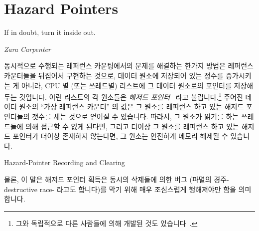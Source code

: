 
\section{Hazard Pointers}
\label{sec:defer:Hazard Pointers}
%
\epigraph{If in doubt, turn it inside out.}{\emph{Zara Carpenter}}

동시적으로 수행되는 레퍼런스 카운팅에서의 문제를 해결하는 한가지 방법은
레퍼런스 카운터들을 뒤집어서 구현하는 것으로,
데이터 원소에 저장되어 있는 정수를 증가시키는 게 아니라, CPU 별 (또는 쓰레드별)
리스트에 그 데이터 원소로의 포인터를 저장해 두는 것입니다.
이런 리스트의 각 원소들은 \emph{해저드 포인터}~\cite{MagedMichael04a} 라고
불립니다.\footnote{
	그와 독립적으로 다른 사람들에 의해 개발된 것도
	있습니다~\cite{HerlihyLM02}.}
주어진 데이터 원소의 ``가상 레퍼런스 카운터'' 의 값은 그 원소를 레퍼런스 하고
있는 해저드 포인터들의 갯수를 세는 것으로 얻어질 수 있습니다.
따라서, 그 원소가 읽기를 하는 쓰레드들에 의해 접근할 수 없게 된다면, 그리고
더이상 그 원소를 레퍼런스 하고 있는 해저드 포인터가 더이상 존재하지 않는다면,
그 원소는 안전하게 메모리 해제될 수 있습니다.

\begin{listing}[tbp]

\caption{Hazard-Pointer Recording and Clearing}
\label{lst:defer:Hazard-Pointer Recording and Clearing}
\end{listing}

물론, 이 말은 해저드 포인터 획득은 동시의 삭제들에 의한 버그 (파멸의
경주-destructive race- 라고도 합니다)를 막기 위해 매우 조심스럽게 행해져야만
함을 의미합니다.
\iffalse

